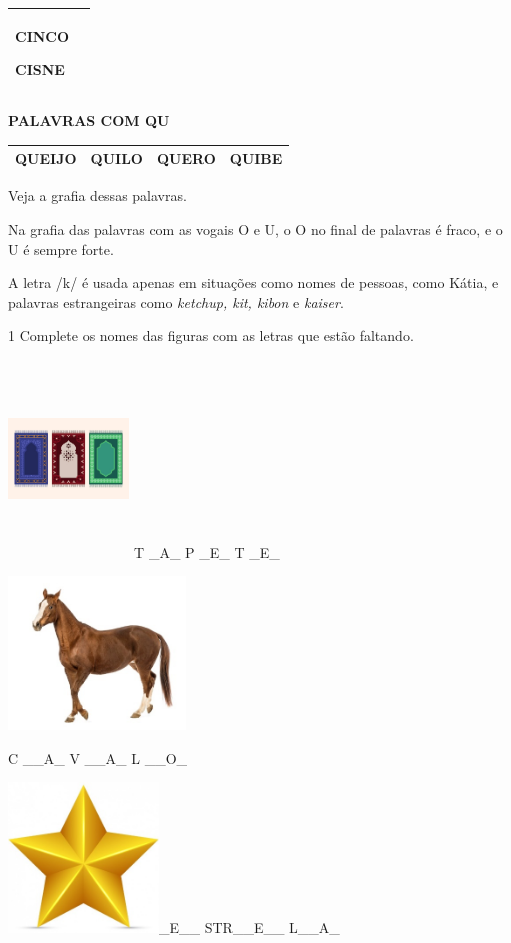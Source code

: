 {\begin{longtable}[]{@{}ll@{}}
\begin{minipage}[t]{0.48\columnwidth}
\textbf{CINCO}

\textbf{CISNE}\strut
\end{minipage}\tabularnewline
\bottomrule
\end{longtable}

\textbf{PALAVRAS COM QU}

\begin{longtable}[]{@{}llll@{}}
\toprule
\textbf{QUEIJO} & \textbf{QUILO} & \textbf{QUERO} &
\textbf{QUIBE}\tabularnewline
\bottomrule
\end{longtable}

Veja a grafia dessas palavras.

Na grafia das palavras com as vogais O e U, o O no final de palavras é
fraco, e o U é sempre forte.


A letra /k/ é usada apenas em situações como nomes de
pessoas, como Kátia, e palavras estrangeiras como
\textit{ketchup, kit, kibon} e \textit{kaiser}.


\num{1} Complete os nomes das figuras com as letras que estão faltando.

\includegraphics[width=1.26518in,height=2.06178in]{media/image1.jpeg} T
\_A\_ P \_E\_ T \_E\_

\includegraphics[width=1.85417in,height=1.60240in]{media/image2.jpeg}

C \_\_A\_ V \_\_A\_ L \_\_O\_

\includegraphics[width=1.57292in,height=1.57292in]{media/image3.jpeg}\_E\_\_
STR\_\_E\_\_ L\_\_A\_

}
